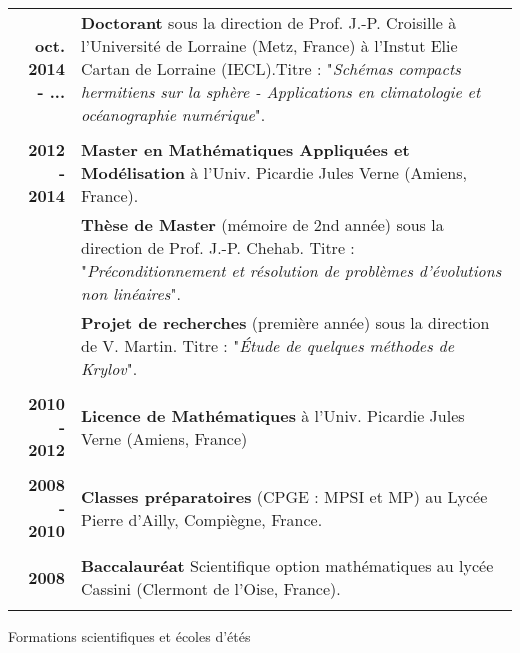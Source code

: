 \documentclass[10pt,a4paper]{report}
\begin{document}
\begin{center}
\begin{tabular}{r p{12cm}}
\textbf{oct. 2014 - ...} & \textbf{Doctorant} sous la direction de Prof. J.-P. Croisille à l'Université de Lorraine (Metz, France) à l'Instut Elie Cartan de Lorraine (IECL).\newline Titre : "\textit{Schémas compacts hermitiens sur la sphère - Applications en climatologie et océanographie numérique}".\\

& \\

\textbf{2012 - 2014} & \textbf{Master en Mathématiques Appliquées et Modélisation} à l'Univ. Picardie Jules Verne (Amiens, France). \\

& \textbf{Thèse de Master} (mémoire de 2nd année) sous la direction de Prof. J.-P. Chehab. \newline 
Titre : "\textit{Préconditionnement et résolution de problèmes d'évolutions non linéaires}". \\

& \textbf{Projet de recherches} (première année) sous la direction de V. Martin. \newline 
Titre : "\textit{\'Etude de quelques méthodes de Krylov}". \\

& \\

\textbf{2010 - 2012} & \textbf{Licence de Mathématiques} à l'Univ. Picardie Jules Verne (Amiens, France) \\

& \\

\textbf{2008 - 2010} & \textbf{Classes préparatoires} (CPGE : MPSI et MP) au Lycée Pierre d'Ailly, Compiègne, France.\\

& \\

\textbf{2008} & \textbf{Baccalauréat} Scientifique option mathématiques au lycée Cassini (Clermont de l'Oise, France).\\

& \\
\end{tabular}
\end{center}

\vspace{.5cm}
\noindent
{\selectfont
\begin{Large}
Formations scientifiques et écoles d'étés
\end{Large}
\hrulefill
}
\vspace{0.6cm}
\end{document}
